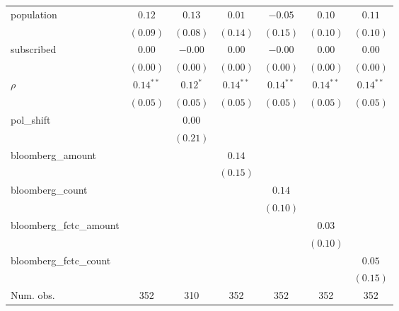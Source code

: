 \begin{table}[!h]
\begin{center}
\begin{tabular}{l c c c c c c }
population              & $0.12$       & $0.13$       & $0.01$       & $-0.05$      & $0.10$       & $0.11$       \\
                        & $(0.09)$     & $(0.08)$     & $(0.14)$     & $(0.15)$     & $(0.10)$     & $(0.10)$     \\
subscribed              & $0.00$       & $-0.00$      & $0.00$       & $-0.00$      & $0.00$       & $0.00$       \\
                        & $(0.00)$     & $(0.00)$     & $(0.00)$     & $(0.00)$     & $(0.00)$     & $(0.00)$     \\
$\rho$                  & $0.14^{**}$  & $0.12^{*}$   & $0.14^{**}$  & $0.14^{**}$  & $0.14^{**}$  & $0.14^{**}$  \\
                        & $(0.05)$     & $(0.05)$     & $(0.05)$     & $(0.05)$     & $(0.05)$     & $(0.05)$     \\
pol\_shift              &              & $0.00$       &              &              &              &              \\
                        &              & $(0.21)$     &              &              &              &              \\
bloomberg\_amount       &              &              & $0.14$       &              &              &              \\
                        &              &              & $(0.15)$     &              &              &              \\
bloomberg\_count        &              &              &              & $0.14$       &              &              \\
                        &              &              &              & $(0.10)$     &              &              \\
bloomberg\_fctc\_amount &              &              &              &              & $0.03$       &              \\
                        &              &              &              &              & $(0.10)$     &              \\
bloomberg\_fctc\_count  &              &              &              &              &              & $0.05$       \\
                        &              &              &              &              &              & $(0.15)$     \\
\midrule
Num. obs.               & 352          & 310          & 352          & 352          & 352          & 352          \\

\end{tabular}
\end{center}
\end{table}
